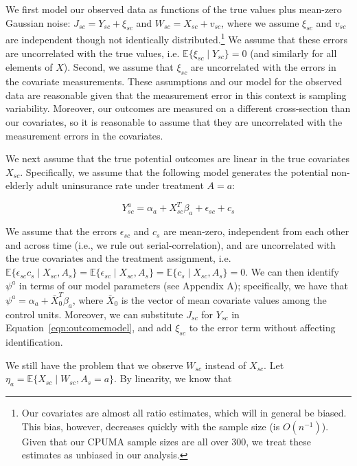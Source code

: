 We first model our observed data as functions of the true values plus mean-zero Gaussian noise: $J_{sc} = Y_{sc} + \xi_{sc}$ and $W_{sc} = X_{sc} + v_{sc}$, where we assume $\xi_{sc}$ and $v_{sc}$ are independent though not identically distributed.\footnote{Our covariates are almost all ratio estimates, which will in general be biased. This bias, however, decreases quickly with the sample size (is $O(n^{-1})$). Given that our CPUMA sample sizes are all over 300, we treat these estimates as unbiased in our analysis.} We assume that these errors are uncorrelated with the true values, i.e. $\mathbb{E}\{\xi_{sc} \mid Y_{sc}\} = 0$ (and similarly for all elements of $X$). Second, we assume that $\xi_{sc}$ are uncorrelated with the errors in the covariate measurements. These assumptions and our model for the observed data are reasonable given that the measurement error in this context is sampling variability. Moreover, our outcomes are measured on a different cross-section than our covariates, so it is reasonable to assume that they are uncorrelated with the measurement errors in the covariates. 

We next assume that the true potential outcomes are linear in the true covariates $X_{sc}$. Specifically, we assume that the following model generates the potential non-elderly adult uninsurance rate under treatment $A = a$:

\begin{equation}\label{eqn:outcomemodel}
Y_{sc}^a = \alpha_a + X_{sc}^T\beta_a + \epsilon_{sc} + c_s
\end{equation}

We assume that the errors $\epsilon_{sc}$ and $c_s$ are mean-zero, independent from each other and across time (i.e., we rule out serial-correlation), and are uncorrelated with the true covariates and the treatment assignment, i.e. $\mathbb{E}\{\epsilon_{sc}c_s \mid X_{sc}, A_s\} = \mathbb{E}\{\epsilon_{sc} \mid X_{sc}, A_s\} = \mathbb{E}\{c_s \mid X_{sc}, A_s\} = 0$. We can then identify $\psi^a$ in terms of our model parameters (see Appendix A); specifically, we have that $\psi^a = \alpha_a + \bar{X}_0^T\beta_a$, where $\bar{X}_0$ is the vector of mean covariate values among the control units. Moreover, we can substitute $J_{sc}$ for $Y_{sc}$ in Equation~\ref{eqn:outcomemodel}, and add $\xi_{sc}$ to the error term without affecting identification. 

We still have the problem that we observe $W_{sc}$ instead of $X_{sc}$. Let $\eta_a = \mathbb{E}\{X_{sc} \mid W_{sc}, A_s = a\}$. By linearity, we know that

